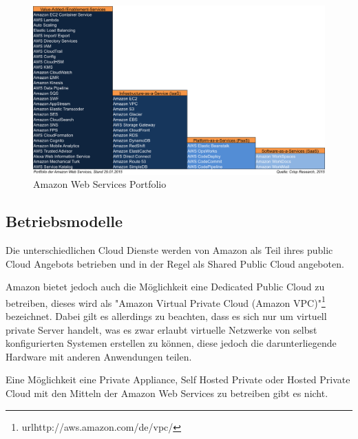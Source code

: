 \begin{figure}
	\centering
	\includegraphics[width=0.8\linewidth]{images/Crisp-AWS-Portfolio_201501291}
	\caption{Amazon Web Services Portfolio }
	\label{fig:amazon}
\end{figure}

\subsection{Betriebsmodelle}
\label{sec_amazon_deployment}
Die unterschiedlichen Cloud Dienste werden von Amazon als Teil ihres public Cloud Angebots betrieben und in der Regel als Shared Public Cloud angeboten.

Amazon bietet jedoch auch die Möglichkeit eine Dedicated Public Cloud zu betreiben, dieses wird als "Amazon Virtual Private Cloud (Amazon VPC)"\footnote{url{http://aws.amazon.com/de/vpc/}} bezeichnet. Dabei gilt es allerdings zu beachten, dass es sich nur um virtuell private Server handelt, was es zwar erlaubt virtuelle Netzwerke von selbst konfigurierten  Systemen erstellen zu können, diese jedoch die darunterliegende Hardware mit anderen Anwendungen teilen. 

Eine Möglichkeit eine Private Appliance, Self Hosted Private oder Hosted Private Cloud mit den Mitteln der Amazon Web Services zu betreiben gibt es nicht. \cite{amazonPrivate}
